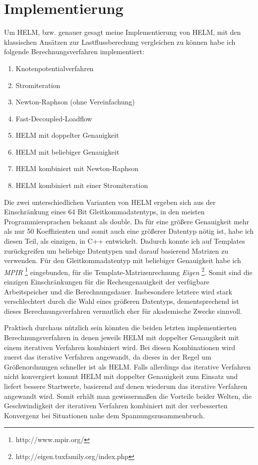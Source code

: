 \documentclass[12pt,a4paper]{article}
\begin{document}
	\section{Implementierung}
	
	Um HELM, bzw. genauer gesagt meine Implementierung von HELM, mit den klassischen Ansätzen zur Lastflussberechung vergleichen zu können habe ich folgende Berechnungsverfahren implementiert:
	\begin{enumerate}
		\item Knotenpotentialverfahren
		\item Stromiteration
		\item Newton-Raphson (ohne Vereinfachung)
		\item Fast-Decoupled-Loadflow
		\item HELM mit doppelter Genauigkeit
		\item HELM mit beliebiger Genauigkeit
		\item HELM kombiniert mit Newton-Raphson
		\item HELM kombiniert mit einer Stromiteration
	\end{enumerate}
	
	Die zwei unterschiedlichen Varianten von HELM ergeben sich aus der Einschränkung eines 64 Bit Gleitkommadatentyps, in den meisten Programmiersprachen bekannt als double. Da für eine größere Genauigkeit mehr als nur 50 Koeffizienten und somit auch eine größerer Datentyp nötig ist, habe ich diesen Teil, als einzigen, in C++ entwickelt. Dadurch konnte ich auf Templates zurückgreifen um beliebige Datentypen und darauf basierend Matrizen zu verwenden. Für den Gleitkommadatentyp mit beliebiger Genauigkeit habe ich \emph{MPIR} \footnote{http://www.mpir.org/} eingebunden, für die Template-Matrizenrechnung \emph{Eigen} \footnote{http://eigen.tuxfamily.org/index.php}. Somit sind die einzigen Einschränkungen für die Rechengenauigkeit der verfügbare Arbeitspeicher und die Berechnungsdauer. Insbesondere letztere wird stark verschlechtert durch die Wahl eines größeren Datentyps, dementsprechend ist dieses Berechnungsverfahren vermutlich eher für akademische Zwecke sinnvoll.
	
	Praktisch durchaus nützlich sein könnten die beiden letzten implementierten Berechnungsverfahren in denen jeweils HELM mit doppelter Genaugikeit mit einem iterativen Verfahren kombiniert wird. Bei diesen Kombinationen wird zuerst das iterative Verfahren angewandt, da dieses in der Regel um Größenordnungen schneller ist als HELM. Falls allerdings das iterative Verfahren nicht konvergiert kommt HELM mit doppelter Genauigkeit zum Einsatz und liefert bessere Startwerte, basierend auf denen wiederum das iterative Verfahren angewandt wird. Somit erhält man gewissermaßen die Vorteile beider Welten, die Geschwindigkeit der iterativen Verfahren kombiniert mit der verbesserten Konvergenz bei Situationen nahe dem Spannungszusammenbruch.
	
\end{document}
